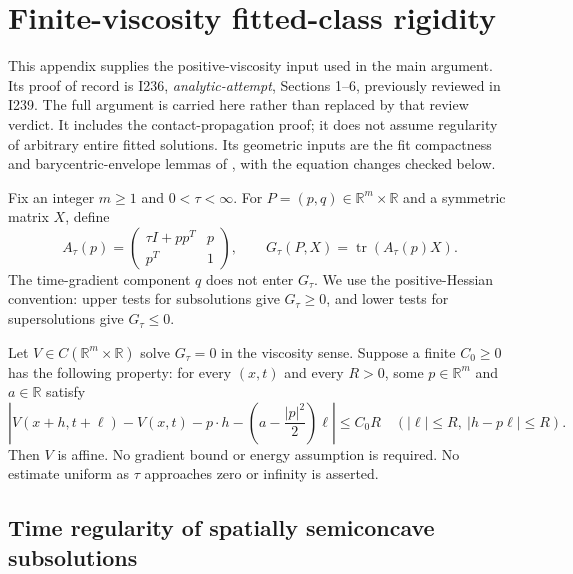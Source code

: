 \section{Finite-viscosity fitted-class rigidity}\label{app:viscous}

This appendix supplies the positive-viscosity input used in the main
argument. Its proof of record is I236, \emph{analytic-attempt},
Sections 1--6, previously reviewed in I239. The full argument is
carried here rather than replaced by that review verdict.
It includes the contact-propagation proof; it does not assume
regularity of arbitrary entire fitted solutions. Its geometric inputs
are the fit compactness and barycentric-envelope lemmas of
\cite[Sections 4--5]{OpenAI}, with the equation changes checked below.

Fix an integer $m\geq1$ and $0<\tau<\infty$. For $P=(p,q)\in
\mathbb R^m\times\mathbb R$ and a symmetric matrix $X$, define
\[
 A_\tau(p)=\begin{pmatrix}\tau I+pp^T&p\\p^T&1\end{pmatrix},
 \qquad G_\tau(P,X)=\operatorname{tr}(A_\tau(p)X).
\]
The time-gradient component $q$ does not enter $G_\tau$. We use the
positive-Hessian convention: upper tests for subsolutions give
$G_\tau\geq0$, and lower tests for supersolutions give $G_\tau\leq0$.

\begin{theorem}\label{thm:viscous}
Let $V\in C(\mathbb R^m\times\mathbb R)$ solve $G_\tau=0$ in the
viscosity sense. Suppose a finite $C_0\geq0$ has the following property:
for every $(x,t)$ and every $R>0$, some $p\in\mathbb R^m$ and
$a\in\mathbb R$ satisfy
\begin{equation}\label{eq:app-fit}
 \left|V(x+h,t+\ell)-V(x,t)-p\cdot h
       -\left(a-\frac{|p|^2}{2}\right)\ell\right|\leq C_0R
 \quad (|\ell|\leq R,\ |h-p\ell|\leq R).
\end{equation}
Then $V$ is affine. No gradient bound or energy assumption is required.
No estimate uniform as $\tau$ approaches zero or infinity is asserted.
\end{theorem}

\subsection{Time regularity of spatially semiconcave subsolutions}

